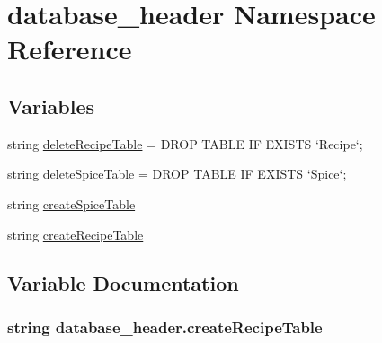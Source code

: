 \hypertarget{namespacedatabase__header}{}\section{database\+\_\+header Namespace Reference}
\label{namespacedatabase__header}
\subsection*{Variables}
\begin{DoxyCompactItemize}
\item 
string \hyperlink{namespacedatabase__header_aa86f8403cffc6b4443b9a220eb1192c7}{delete\+Recipe\+Table} = \textquotesingle{}D\+R\+OP T\+A\+B\+LE IF E\+X\+I\+S\+TS `Recipe`;\textquotesingle{}
\item 
string \hyperlink{namespacedatabase__header_a2f8921645ad6be4726eb88f353a6f992}{delete\+Spice\+Table} = \textquotesingle{}D\+R\+OP T\+A\+B\+LE IF E\+X\+I\+S\+TS `Spice`;\textquotesingle{}
\item 
string \hyperlink{namespacedatabase__header_a1e3043bca03600416421e49e7abceddf}{create\+Spice\+Table}
\item 
string \hyperlink{namespacedatabase__header_af418d39c0c50717e7a56ead5927395ff}{create\+Recipe\+Table}
\end{DoxyCompactItemize}


\subsection{Variable Documentation}
\subsubsection[{\texorpdfstring{create\+Recipe\+Table}{createRecipeTable}}]{\setlength{\rightskip}{0pt plus 5cm}string database\+\_\+header.\+create\+Recipe\+Table}\hypertarget{namespacedatabase__header_af418d39c0c50717e7a56ead5927395ff}{}\label{namespacedatabase__header_af418d39c0c50717e7a56ead5927395ff}
